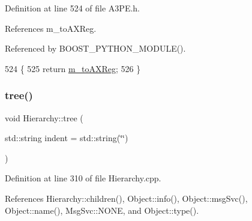 Definition at line 524 of file A3\+P\+E.\+h.



References m\+\_\+to\+A\+X\+Reg.



Referenced by B\+O\+O\+S\+T\+\_\+\+P\+Y\+T\+H\+O\+N\+\_\+\+M\+O\+D\+U\+L\+E().


\begin{DoxyCode}
524                      \{
525     \textcolor{keywordflow}{return} \hyperlink{classA3PE_abe8eb76e3c0d967403726143deb1b70f}{m\_toAXReg};
526   \}
\end{DoxyCode}
\mbox{\label{classHierarchy_a76e914b9a677a22a82deb74d892bf261}} 
\subsubsection{\texorpdfstring{tree()}{tree()}\hspace{0.1cm}{\footnotesize\ttfamily [1/2]}}
{\footnotesize\ttfamily void Hierarchy\+::tree (\begin{DoxyParamCaption}\item[{std\+::string}]{indent = {\ttfamily std\+:\+:string(\char`\"{}\char`\"{})} }\end{DoxyParamCaption})\hspace{0.3cm}{\ttfamily [inherited]}}



Definition at line 310 of file Hierarchy.\+cpp.



References Hierarchy\+::children(), Object\+::info(), Object\+::msg\+Svc(), Object\+::name(), Msg\+Svc\+::\+N\+O\+NE, and Object\+::type().


